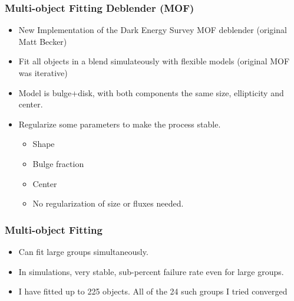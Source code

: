 \documentclass{beamer}
\begin{document}
\frame
{
    \frametitle{Multi-object Fitting Deblender (MOF)}

    \begin{itemize}

        \item New Implementation of the Dark Energy Survey MOF deblender
            (original Matt Becker)

        \item Fit all objects in a blend simulateously
            with flexible models (original MOF was iterative)

        \item Model is bulge+disk, with both components
            the same size, ellipticity and center.

        \item Regularize some parameters to make the process stable.
            \begin{itemize}
                \item Shape
                \item Bulge fraction
                \item Center
                \item No regularization of size or fluxes needed.
            \end{itemize}

    \end{itemize}

}

\frame
{
    \frametitle{Multi-object Fitting}

    \begin{itemize}
            
        \item Can fit large groups simultaneously.

        \item In simulations, very stable, sub-percent failure rate even for
            large groups.

        \item I have fitted up to 225 objects. All of the 24 such groups I
            tried converged

    \end{itemize}

}
\end{document}

